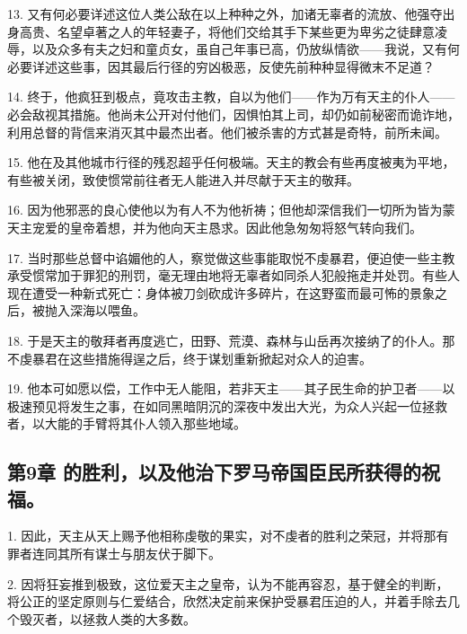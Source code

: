 13. 又有何必要详述这位人类公敌在以上种种之外，加诸无辜者的流放、他强夺出身高贵、名望卓著之人的年轻妻子，将他们交给其手下某些更为卑劣之徒肆意凌辱，以及众多有夫之妇和童贞女，虽自己年事已高，仍放纵情欲——我说，又有何必要详述这些事，因其最后行径的穷凶极恶，反使先前种种显得微末不足道？\par

14. 终于，他疯狂到极点，竟攻击主教，自以为他们——作为万有天主的仆人——必会敌视其措施。他尚未公开对付他们，因惧怕其上司，却仍如前秘密而诡诈地，利用总督的背信来消灭其中最杰出者。他们被杀害的方式甚是奇特，前所未闻。\par

15. 他在及其他城市行径的残忍超乎任何极端。天主的教会有些再度被夷为平地，有些被关闭，致使惯常前往者无人能进入并尽献于天主的敬拜。\par

16. 因为他邪恶的良心使他以为有人不为他祈祷；但他却深信我们一切所为皆为蒙天主宠爱的皇帝着想，并为他向天主恳求。因此他急匆匆将怒气转向我们。\par

17. 当时那些总督中谄媚他的人，察觉做这些事能取悦不虔暴君，便迫使一些主教承受惯常加于罪犯的刑罚，毫无理由地将无辜者如同杀人犯般拖走并处罚。有些人现在遭受一种新式死亡：身体被刀剑砍成许多碎片，在这野蛮而最可怖的景象之后，被抛入深海以喂鱼。\par

18. 于是天主的敬拜者再度逃亡，田野、荒漠、森林与山岳再次接纳了的仆人。那不虔暴君在这些措施得逞之后，终于谋划重新掀起对众人的迫害。\par

19. 他本可如愿以偿，工作中无人能阻，若非天主——其子民生命的护卫者——以极速预见将发生之事，在如同黑暗阴沉的深夜中发出大光，为众人兴起一位拯救者，以大能的手臂将其仆人领入那些地域。\par


\subsection{第9章 的胜利，以及他治下罗马帝国臣民所获得的祝福。}

1. 因此，天主从天上赐予他相称虔敬的果实，对不虔者的胜利之荣冠，并将那有罪者连同其所有谋士与朋友伏于脚下。\par

2. 因将狂妄推到极致，这位爱天主之皇帝，认为不能再容忍，基于健全的判断，将公正的坚定原则与仁爱结合，欣然决定前来保护受暴君压迫的人，并着手除去几个毁灭者，以拯救人类的大多数。\par

